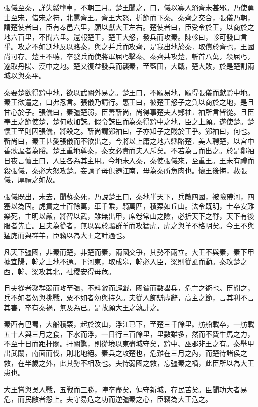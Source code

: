 張儀至秦，詳失綏墮車，不朝三月。楚王聞之，曰，儀以寡人絕齊未甚邪。乃使勇士至宋，借宋之符，北罵齊王。齊王大怒，折節而下秦。秦齊之交合，張儀乃朝，謂楚使者曰，臣有奉邑六里，願以獻大王左右。楚使者曰，臣受令於王，以商於之地六百里，不聞六里。還報楚王，楚王大怒，發兵而攻秦。陳軫曰，軫可發口言乎。攻之不如割地反以賂秦，與之并兵而攻齊，是我出地於秦，取償於齊也，王國尚可存。楚王不聽，卒發兵而使將軍屈丐擊秦。秦齊共攻楚，斬首八萬，殺屈丐，遂取丹陽、漢中之地。楚又復益發兵而襲秦，至藍田，大戰，楚大敗，於是楚割兩城以與秦平。

秦要楚欲得黔中地，欲以武關外易之。楚王曰，不願易地，願得張儀而獻黔中地。秦王欲遣之，口弗忍言。張儀乃請行。惠王曰，彼楚王怒子之負以商於之地，是且甘心於子。張儀曰，秦彊楚弱，臣善靳尚，尚得事楚夫人鄭袖，袖所言皆從。且臣奉王之節使楚，楚何敢加誅。假令誅臣而為秦得黔中之地，臣之上願。遂使楚。楚懷王至則囚張儀，將殺之。靳尚謂鄭袖曰，子亦知子之賤於王乎。鄭袖曰，何也。靳尚曰，秦王甚愛張儀而不欲出之，今將以上庸之地六縣賂楚，美人聘楚，以宮中善歌謳者為媵。楚王重地尊秦，秦女必貴而夫人斥矣。不若為言而出之。於是鄭袖日夜言懷王曰，人臣各為其主用。今地未入秦，秦使張儀來，至重王。王未有禮而殺張儀，秦必大怒攻楚。妾請子母俱遷江南，毋為秦所魚肉也。懷王後悔，赦張儀，厚禮之如故。

張儀既出，未去，聞蘇秦死，乃說楚王曰，秦地半天下，兵敵四國，被險帶河，四塞以為固。虎賁之士百餘萬，車千乘，騎萬匹，積粟如丘山。法令既明，士卒安難樂死，主明以嚴，將智以武，雖無出甲，席卷常山之險，必折天下之脊，天下有後服者先亡。且夫為從者，無以異於驅群羊而攻猛虎，虎之與羊不格明矣。今王不與猛虎而與群羊，臣竊以為大王之計過也。

凡天下彊國，非秦而楚，非楚而秦，兩國交爭，其勢不兩立。大王不與秦，秦下甲據宜陽，韓之上地不通。下河東，取成皋，韓必入臣，梁則從風而動。秦攻楚之西，韓、梁攻其北，社稷安得毋危。

且夫從者聚群弱而攻至彊，不料敵而輕戰，國貧而數舉兵，危亡之術也。臣聞之，兵不如者勿與挑戰，粟不如者勿與持久。夫從人飾辯虛辭，高主之節，言其利不言其害，卒有秦禍，無及為已。是故願大王之孰計之。

秦西有巴蜀，大船積粟，起於汶山，浮江已下，至楚三千餘里。舫船載卒，一舫載五十人與三月之食，下水而浮，一日行三百餘里，里數雖多，然而不費牛馬之力，不至十日而距扜關。扜關驚，則從境以東盡城守矣，黔中、巫郡非王之有。秦舉甲出武關，南面而伐，則北地絕。秦兵之攻楚也，危難在三月之內，而楚待諸侯之救，在半歲之外，此其勢不相及也。夫恃弱國之救，忘彊秦之禍，此臣所以為大王患也。

大王嘗與吳人戰，五戰而三勝，陣卒盡矣，偏守新城，存民苦矣。臣聞功大者易危，而民敝者怨上。夫守易危之功而逆彊秦之心，臣竊為大王危之。

